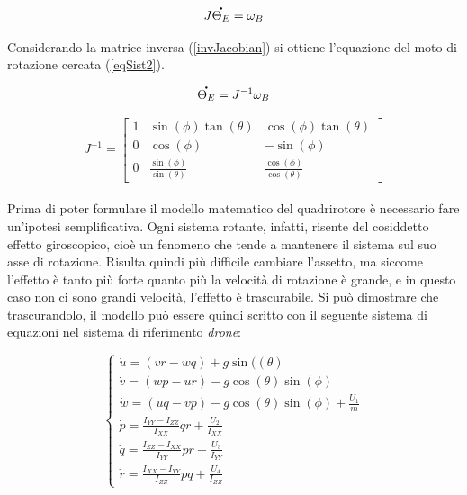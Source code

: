 \begin{equation}
	J\accentset{\mbox{\large\bfseries .}}{\Theta_E} = \omega_B
	\label{jacobian}
\end{equation}

Considerando la matrice inversa (\ref{invJacobian}) si ottiene l'equazione del moto di rotazione cercata (\ref{eqSist2}).

\begin{equation}
	\accentset{\mbox{\large\bfseries .}}{\Theta_E} = J^{-1}\omega_B
	\label{eqSist2}
\end{equation}

\begin{equation}
J^{-1}
=
\begin{bmatrix}
1 & \sin(\phi)\tan(\theta) & \cos(\phi)\tan(\theta)\\
0 & \cos(\phi) & -\sin(\phi)\\
0 & \frac{\sin(\phi)}{\sin(\theta)} & \frac{\cos(\phi)}{\cos(\theta)}
\end{bmatrix}
\label{invJacobian}
\end{equation}\\

Prima di poter formulare il modello matematico del quadrirotore è necessario fare un'ipotesi semplificativa. Ogni sistema rotante, infatti, risente del cosiddetto effetto giroscopico, cioè un fenomeno che tende a mantenere il sistema sul suo asse di rotazione. Risulta quindi più difficile cambiare l’assetto, ma siccome l’effetto è tanto più forte quanto più la velocità di rotazione è grande, e in questo caso non ci sono grandi velocità, l’effetto è trascurabile. Si può dimostrare che trascurandolo, il modello può essere quindi scritto con il seguente sistema di equazioni nel sistema di riferimento \emph{drone}:

\begin{equation}
	\begin{cases}
	\Dot{u} = (vr - wq) + g\sin((\theta) \\
	\Dot{v} = (wp - ur) - g\cos(\theta)\sin(\phi) \\
	\Dot{w} = (uq - vp) - g\cos(\theta)\sin(\phi) + \frac{U_1}{m} \\
	\Dot{p} = \frac{I_{YY} - I_{ZZ}}{I_{XX}}qr + \frac{U_2}{I_{XX}} \\
	\Dot{q} = \frac{I_{ZZ} - I_{XX}}{I_{YY}}pr + \frac{U_3}{I_{YY}} \\
	\Dot{r} = \frac{I_{XX} - I_{YY}}{I_{ZZ}}pq + \frac{U_4}{I_{ZZ}}
	\end{cases}
	\label{modelloQuadrirotoreDrone}
\end{equation}


